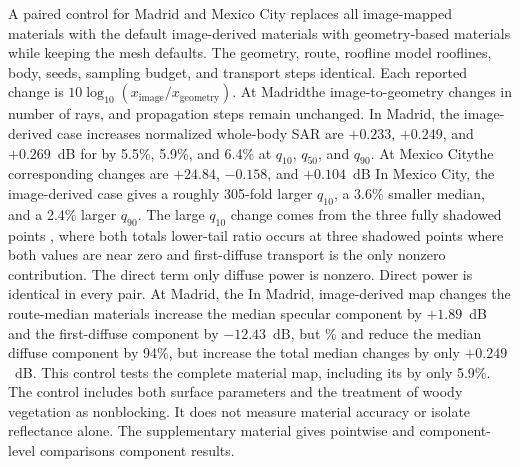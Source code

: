 \documentclass{IEEEoj} %
\providecommand{\DIFadd}[1]{{\protect\color{blue} \sf #1}} %
\providecommand{\DIFdel}[1]{{\protect\color{red} \scriptsize #1}} %
\providecommand{\DIFaddbegin}{} %
\providecommand{\DIFaddend}{} %
\providecommand{\DIFdelbegin}{} %
\providecommand{\DIFdelend}{} %
\begin{document}
A paired control for Madrid and Mexico City replaces all \DIFdelbegin \DIFdel{image-mapped materials with the default }\DIFdelend \DIFaddbegin \DIFadd{image-derived
materials with }\DIFaddend geometry-based \DIFdelbegin \DIFdel{materials while keeping the mesh}\DIFdelend \DIFaddbegin \DIFadd{defaults. The geometry}\DIFaddend , route, \DIFdelbegin \DIFdel{roofline model}\DIFdelend \DIFaddbegin \DIFadd{rooflines}\DIFaddend , body,
seeds, \DIFdelbegin \DIFdel{sampling budget, and transport steps identical.
Each reported change is
$10\log_{10}(x_{\mathrm{image}}/x_{\mathrm{geometry}})$. At Madridthe
image-to-geometry changes in }\DIFdelend \DIFaddbegin \DIFadd{number of rays, and propagation steps remain unchanged. In Madrid, the
image-derived case increases }\DIFaddend normalized whole-body SAR \DIFdelbegin \DIFdel{are $+0.233$, $+0.249$, and
$+0.269$~dB for }\DIFdelend \DIFaddbegin \DIFadd{by 5.5\%, 5.9\%, and
6.4\% at }\DIFaddend $q_{10}$, $q_{50}$, and $q_{90}$. \DIFdelbegin \DIFdel{At Mexico Citythe
corresponding changes are $+24.84$, $-0.158$, and $+0.104$~dB}\DIFdelend \DIFaddbegin \DIFadd{In Mexico City, the image-derived case gives a roughly
305-fold larger $q_{10}$, a 3.6\% smaller median, and a 2.4\% larger $q_{90}$}\DIFaddend .
The large \DIFdelbegin \DIFdel{$q_{10}$ change comes from the three fully shadowed points , where both totals
}\DIFdelend \DIFaddbegin \DIFadd{lower-tail ratio occurs at three shadowed points where both values }\DIFaddend are
near zero and \DIFdelbegin \DIFdel{first-diffuse transport is the only nonzero contribution. The
direct term }\DIFdelend \DIFaddbegin \DIFadd{only diffuse power is nonzero. Direct power }\DIFaddend is identical in every
pair. \DIFdelbegin \DIFdel{At Madrid, the }\DIFdelend \DIFaddbegin \DIFadd{In Madrid, }\DIFaddend image-derived \DIFdelbegin \DIFdel{map changes
the route-median }\DIFdelend \DIFaddbegin \DIFadd{materials increase the median }\DIFaddend specular component
by \DIFdelbegin \DIFdel{$+1.89$~dB and the first-diffuse
component by $-12.43$~dB, but }\DIFdelend \DIFaddbegin \DIFadd{54\% and reduce the median diffuse component by 94\%, but increase }\DIFaddend the total
median \DIFdelbegin \DIFdel{changes by only $+0.249$~dB. This control tests the complete material map, including its }\DIFdelend \DIFaddbegin \DIFadd{by only 5.9\%. The control includes both surface }\DIFaddend parameters and the
treatment of woody vegetation as nonblocking. It does not measure material
accuracy or isolate reflectance alone. The supplementary material gives
pointwise and \DIFdelbegin \DIFdel{component-level comparisons}\DIFdelend \DIFaddbegin \DIFadd{component results}\DIFaddend .
\end{document}
